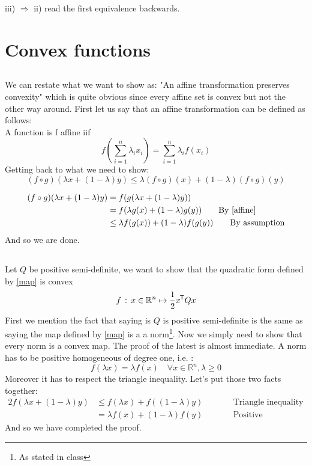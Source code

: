 \documentclass{article}
\newcommand*{\tran}{^{\mkern-1.5mu\mathsf{T}}}%
\begin{document}
	iii) $\Rightarrow$ ii) read the first equivalence backwards. 
	
	\clearpage
	\section{Convex functions}
	
	\subsection{}
	
	We can restate what we want to show as: "An affine transformation preserves convexity" which is quite obvious since every affine set is convex but not the other way around. First let us say that an affine transformation can be defined as follows:\\
	A function is f affine iif 
	\begin{equation}\label{affine}
		f\left(\sum_{i=1}^{n}\lambda_i x_i\right)  = \sum_{i=1}^{n}\lambda_i f(x_i)
	\end{equation}
	Getting back to what we need to show:
	\begin{equation}
		(f \circ g ) (\lambda x + (1-\lambda )y) \leq \lambda (f\circ g)(x) + (1-\lambda )(f\circ g)(y)
	\end{equation}
	
	\begin{align*}
	(f\circ g)(\lambda x + (1-\lambda )y) &= f(g(\lambda x + (1-\lambda )y))\\
									  &= f(\lambda g(x) + (1-\lambda)g(y)) \qquad\text{By \ref{affine}}\\
									  &\leq \lambda f(g(x)) + (1-\lambda)f(g(y)) \qquad \text{By assumption}
	\end{align*}
	And so we are done.
	
	\subsection{}
	Let $Q$ be positive semi-definite, we want to show that the quadratic form defined by  \ref{map} is convex 
	\begin{equation}\label{map}
		f\, :\, x\in \mathbb{R}^n \mapsto \frac{1}{2} x\tran Q x
	\end{equation}
	First we mention the fact that saying is $Q$ is positive semi-definite is the same as saying the map defined by \ref{map} is a a norm\footnote{As stated in class}. Now we simply need to show that every norm is a convex map. The proof of the latest is almost immediate. A norm has to be positive homogeneous of degree one, i.e. : 
	\begin{equation}
		f(\lambda x) = \lambda f(x) \quad \forall x \in \mathbb{R}^n, \lambda \geq 0
	\end{equation}
	Moreover it has to respect the triangle inequality. Let's put those two facts together:
	\begin{alignat*}{2}
		f(\lambda x + (1-\lambda)y ) &\leq f(\lambda x) + f((1-\lambda )y) \qquad && \text{Triangle inequality}\\
		&= \lambda f(x) + (1-\lambda)f(y) \qquad &&\text{Positive homogeneous degree 1}
	\end{alignat*}
	And so we have completed the proof.
	
	
	
	
	
	
	
	
	
	
	
	
	
	
\end{document}
